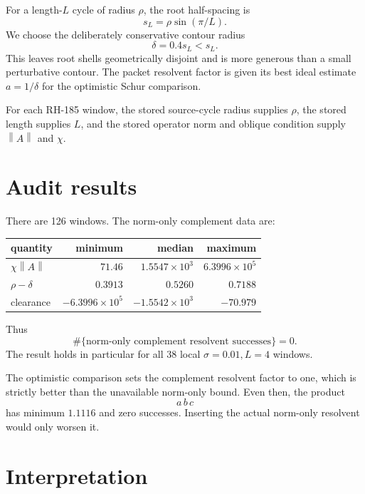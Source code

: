 \documentclass[12pt]{article}
\theoremstyle{remark}
\newcommand{\norm}[1]{\left\lVert#1\right\rVert}
\begin{document}
For a length-$L$ cycle of radius $\rho$, the root half-spacing is
\begin{equation}\label{eq:spacing}
 s_L=\rho\sin(\pi/L).
\end{equation}
We choose the deliberately conservative contour radius
\begin{equation}\label{eq:contour}
 \delta=0.4s_L<s_L.
\end{equation}
This leaves root shells geometrically disjoint and is more generous than a
small perturbative contour.  The packet resolvent factor is given its best
ideal estimate $a=1/\delta$ for the optimistic Schur comparison.

For each RH-185 window, the stored source-cycle radius supplies $\rho$, the
stored length supplies $L$, and the stored operator norm and oblique condition
supply $\norm A$ and $\chi$.

\section{Audit results}

There are 126 windows.  The norm-only complement data are:
\begin{center}
\begin{tabular}{lrrr}
\toprule
quantity & minimum & median & maximum\\
\midrule
$\chi\norm A$ & $71.46$ & $1.5547\times10^3$
& $6.3996\times10^5$\\
$\rho-\delta$ & $0.3913$ & $0.5260$ & $0.7188$\\
clearance & $-6.3996\times10^5$ & $-1.5542\times10^3$
& $-70.979$\\
\bottomrule
\end{tabular}
\end{center}
Thus
\begin{equation}\label{eq:no-clearance}
 \#\{\text{norm-only complement resolvent successes}\}=0.
\end{equation}
The result holds in particular for all 38 local $\sigma=0.01,L=4$ windows.

The optimistic comparison sets the complement resolvent factor to one,
which is strictly better than the unavailable norm-only bound.  Even then,
the product
\begin{equation}\label{eq:optimistic}
 a\,b\,c
\end{equation}
has minimum $1.1116$ and zero successes.  Inserting the actual norm-only
resolvent would only worsen it.

\section{Interpretation}
\end{document}
